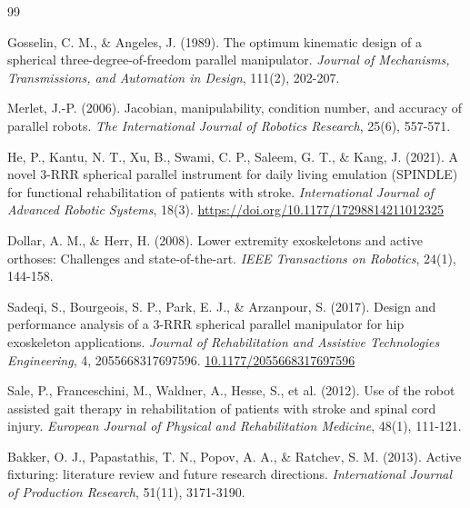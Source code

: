 \documentclass[letterpaper, 10 pt, conference]{ieeeconf}  %
\begin{document}









  
\begin{thebibliography}{99}

Gosselin, C. M., \& Angeles, J. (1989). The optimum kinematic design of a spherical three-degree-of-freedom parallel manipulator. \textit{Journal of Mechanisms, Transmissions, and Automation in Design}, 111(2), 202-207.

Merlet, J.-P. (2006). Jacobian, manipulability, condition number, and accuracy of parallel robots. \textit{The International Journal of Robotics Research}, 25(6), 557-571.

He, P., Kantu, N. T., Xu, B., Swami, C. P., Saleem, G. T., \& Kang, J. (2021). A novel 3-RRR spherical parallel instrument for daily living emulation (SPINDLE) for functional rehabilitation of patients with stroke. \textit{International Journal of Advanced Robotic Systems}, 18(3). \url{https://doi.org/10.1177/17298814211012325}

Dollar, A. M., \& Herr, H. (2008). Lower extremity exoskeletons and active orthoses: Challenges and state-of-the-art. \textit{IEEE Transactions on Robotics}, 24(1), 144-158.

Sadeqi, S., Bourgeois, S. P., Park, E. J., \& Arzanpour, S. (2017). Design and performance analysis of a 3-RRR spherical parallel manipulator for hip exoskeleton applications. \textit{Journal of Rehabilitation and Assistive Technologies Engineering}, 4, 2055668317697596. \url{10.1177/2055668317697596}

Sale, P., Franceschini, M., Waldner, A., Hesse, S., et al. (2012). Use of the robot assisted gait therapy in rehabilitation of patients with stroke and spinal cord injury. \textit{European Journal of Physical and Rehabilitation Medicine}, 48(1), 111-121.

Bakker, O. J., Papastathis, T. N., Popov, A. A., \& Ratchev, S. M. (2013). Active fixturing: literature review and future research directions. \textit{International Journal of Production Research}, 51(11), 3171-3190.


\end{thebibliography}
\end{document}
